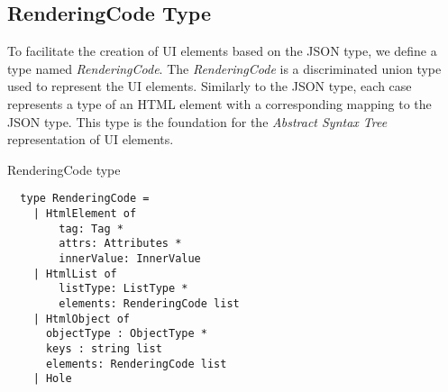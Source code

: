 \subsection{RenderingCode Type}
To facilitate the creation of UI elements based on the JSON type, we define a type named \emph{RenderingCode}.
The \emph{RenderingCode} is a discriminated union type used to represent the UI elements.
Similarly to the JSON type, each case represents a type of an HTML element with a corresponding mapping to the JSON type.
This type is the foundation for the \emph{Abstract Syntax Tree} representation of UI elements.
\begin{listing}[h]
	\caption {RenderingCode type}
	\begin{lstlisting}
  type RenderingCode =
    | HtmlElement of
        tag: Tag *
        attrs: Attributes *
        innerValue: InnerValue
    | HtmlList of
        listType: ListType *
        elements: RenderingCode list
    | HtmlObject of
      objectType : ObjectType *
      keys : string list
      elements: RenderingCode list
    | Hole
  \end{lstlisting}
\end{listing}

